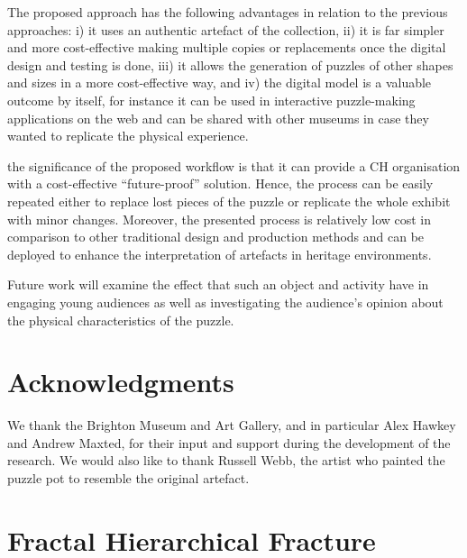 \documentclass[acmlarge,screen,dvipsnames]{acmart}
\begin{document}
The proposed approach has the following advantages in relation to the
previous approaches: i) it uses an authentic artefact of the
collection, ii) it is far simpler and more cost-effective making
multiple copies or replacements once the digital design and testing is
done, iii) it allows the generation of puzzles of other shapes and
sizes in a more cost-effective way, and iv) the digital model is a
valuable outcome by itself, for instance it can be used in interactive
puzzle-making applications on the web and can be shared with other
museums in case they wanted to replicate the physical experience.


 the significance of the proposed workflow is that it can provide a CH organisation with a cost-effective ``future-proof'' solution. Hence,
the process can be easily repeated either to replace lost pieces of
the puzzle or replicate the whole exhibit with minor
changes. Moreover, the presented process is relatively low cost in
comparison to other traditional design and production methods and can
be deployed to enhance the interpretation of artefacts in heritage
environments.

Future work will examine the effect that such an object and activity
have in engaging young audiences as well as investigating the
audience's opinion about the physical characteristics of the puzzle.

\section{Acknowledgments}

We thank the Brighton Museum and Art Gallery, and in particular Alex
Hawkey and Andrew Maxted, for their input and support during the
development of the research. We would also like to thank Russell Webb, the artist who painted the puzzle pot to resemble the original artefact.

\greenBegin
\appendix

\newcommand{\IR}{\RR}

\section{Fractal Hierarchical Fracture}
\label{apx:hierarchical-algo}
\end{document}
